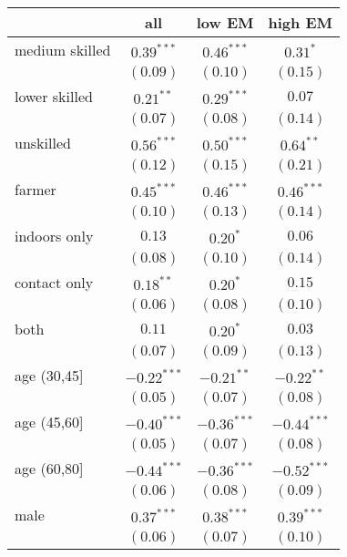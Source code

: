 
\begin{table}[h!]
\begin{center}
\begin{small}
\begin{tabular}{l c c c}
\hline
 & all & low EM & high EM \\
\hline
medium skilled & $0.39^{***}$  & $0.46^{***}$  & $0.31^{*}$    \\
               & $(0.09)$      & $(0.10)$      & $(0.15)$      \\
lower skilled  & $0.21^{**}$   & $0.29^{***}$  & $0.07$        \\
               & $(0.07)$      & $(0.08)$      & $(0.14)$      \\
unskilled      & $0.56^{***}$  & $0.50^{***}$  & $0.64^{**}$   \\
               & $(0.12)$      & $(0.15)$      & $(0.21)$      \\
farmer         & $0.45^{***}$  & $0.46^{***}$  & $0.46^{***}$  \\
               & $(0.10)$      & $(0.13)$      & $(0.14)$      \\
indoors only   & $0.13$        & $0.20^{*}$    & $0.06$        \\
               & $(0.08)$      & $(0.10)$      & $(0.14)$      \\
contact only   & $0.18^{**}$   & $0.20^{*}$    & $0.15$        \\
               & $(0.06)$      & $(0.08)$      & $(0.10)$      \\
both           & $0.11$        & $0.20^{*}$    & $0.03$        \\
               & $(0.07)$      & $(0.09)$      & $(0.13)$      \\
age (30,45]    & $-0.22^{***}$ & $-0.21^{**}$  & $-0.22^{**}$  \\
               & $(0.05)$      & $(0.07)$      & $(0.08)$      \\
age (45,60]    & $-0.40^{***}$ & $-0.36^{***}$ & $-0.44^{***}$ \\
               & $(0.05)$      & $(0.07)$      & $(0.08)$      \\
age (60,80]    & $-0.44^{***}$ & $-0.36^{***}$ & $-0.52^{***}$ \\
               & $(0.06)$      & $(0.08)$      & $(0.09)$      \\
male           & $0.37^{***}$  & $0.38^{***}$  & $0.39^{***}$  \\
               & $(0.06)$      & $(0.07)$      & $(0.10)$      \\

\end{tabular}
\end{small}
\end{center}
\end{table}
